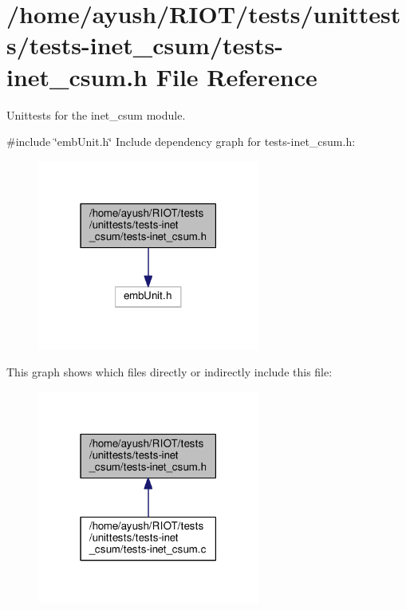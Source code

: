 \hypertarget{tests-inet__csum_8h}{}\section{/home/ayush/\+R\+I\+O\+T/tests/unittests/tests-\/inet\+\_\+csum/tests-\/inet\+\_\+csum.h File Reference}
\label{tests-inet__csum_8h}


Unittests for the {\ttfamily inet\+\_\+csum} module.  


{\ttfamily \#include \char`\"{}emb\+Unit.\+h\char`\"{}}\newline
Include dependency graph for tests-\/inet\+\_\+csum.h\+:
\nopagebreak
\begin{figure}[H]
\begin{center}
\leavevmode
\includegraphics[width=207pt]{tests-inet__csum_8h__incl}
\end{center}
\end{figure}
This graph shows which files directly or indirectly include this file\+:
\nopagebreak
\begin{figure}[H]
\begin{center}
\leavevmode
\includegraphics[width=207pt]{tests-inet__csum_8h__dep__incl}
\end{center}
\end{figure}
